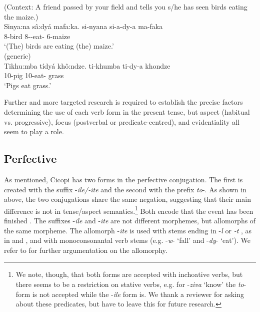 \documentclass[output=paper]{langscibook}
\begin{document}
\z
\z

\ea
\label{bkm:Ref127267133}
\ea
(Context: A friend passed by your field and tells you s/he has seen birds eating the maize.)\\
Sinya:na sâ:dyá mafa:ka. \jambox*{[disjoint]}
\gll
si-nyana  si-a-dy-a  ma-faka\\
8-bird  8\SM-\DJ{}-eat-\FV{}  6-maize\\
\glt
‘(The) birds are eating (the) maize.’\\

 


\ex
(generic)\\
{Tikhu:mba tídyá khô:ndze.}\jambox*{[conjoint]}
\gll
ti-khumba  ti-dy-a  khondze\\
10-pig  10\SM{}-eat-\FV{}  grass\\
\glt
‘Pigs eat grass.’\\

\z
\z

Further and more targeted research is required to establish the precise factors determining the use of each verb form in the present tense, but aspect (habitual vs. progressive), focus (postverbal or predicate-centred), and evidentiality all seem to play a role.

\subsection{Perfective}
\label{bkm:Ref141367401}
As mentioned, Cicopi has two forms in the perfective conjugation. The first is created with the suffix -\textit{ile/-ite} and the second with the prefix \textit{to}-. As shown in  above, the two conjugations share the same negation, suggesting that their main difference is not in tense/aspect semantics.\footnote{We note, though, that both forms are accepted with inchoative verbs, but there seems to be a restriction on stative verbs, e.g. for \nobreakdash-\textit{ziva} ‘know’ the \textit{to}\nobreakdash- form is not accepted while the \nobreakdash-\textit{ile} form is. We thank a reviewer for asking about these predicates, but have to leave this for future research.} Both encode that the event has been finished \citep{Nhantumbo2009}. The suffixes \nobreakdash-\textit{ile} and \nobreakdash-\textit{ite} are not different morphemes, but allomorphs of the same morpheme. The allomorph \nobreakdash-\textit{ite} is used with stems ending in \nobreakdash-\textit{l} or \textit{\nobreakdash-t} \citep{Nhantumbo2014}, as in  and , and with monoconsonantal verb stems (e.g. \nobreakdash-\textit{w}\nobreakdash- ‘fall’ and \nobreakdash-\textit{dy}\nobreakdash- ‘eat’). We refer to \citet{Nhantumbo2019} for further argumentation on the allomorphy.
\end{document}
